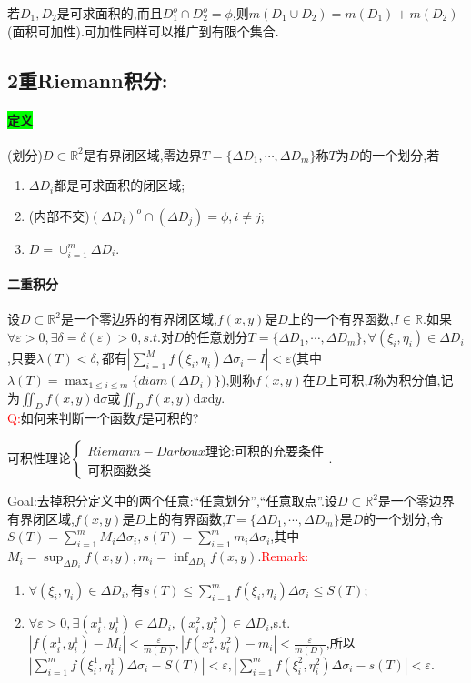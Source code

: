 \documentclass[UTF8]{ctexart}
\renewcommand{\d}{\mathrm{d}}
\begin{document}
        若$D_1,D_2$是可求面积的,而且$D_1^o\cap D_2^o=\phi$,则$m(D_1\cup D_2)=m(D_1)+m(D_2)$(面积可加性).可加性同样可以推广到有限个集合.

    \subsection{2重Riemann积分:}
    \paragraph{\colorbox{lime}{定义}}(划分)$D\subset\mathbb{R}^2$是有界闭区域,零边界$T=\{\Delta D_1,\cdots,\Delta D_m\}$称$T$为$D$的一个划分,若
    \begin{enumerate}[1)]
        \item $\Delta D_i$都是可求面积的闭区域;
        \item (内部不交)$(\Delta D_i)^o\cap(\Delta D_j)=\phi,i\not=j$;
        \item $D=\cup_{i=1}^m\Delta D_i$.
    \end{enumerate}
    \paragraph{二重积分}设$D\subset\mathbb{R}^2$是一个零边界的有界闭区域,$f(x,y)$是$D$上的一个有界函数,$I\in \mathbb{R}$.如果$\forall\varepsilon>0,\exists\delta=\delta(\varepsilon)>0,s.t.$对$D$的任意划分$T=\{\Delta D_1,\cdots,\Delta D_m\},\forall(\xi_i,\eta_i)\in\Delta D_i$,只要$\lambda(T)<\delta,$都有$|\sum_{i=1}^Mf(\xi_i,\eta_i)\Delta\sigma_i-I|<\varepsilon$(其中$\lambda(T)=\max_{1\le i\le m}\{diam(\Delta D_i)\}$),则称$f(x,y)$在$D$上可积,$I$称为积分值,记为$\iint_Df(x,y)\d\sigma$或$\iint_Df(x,y)\d x\d y$.\\
    \textcolor{red}{Q:}如何来判断一个函数$f$是可积的?

    可积性理论$\begin{cases}
        Riemann-Darboux\text{理论:可积的充要条件}\\
        \text{可积函数类}
    \end{cases}$.

    Goal:去掉积分定义中的两个任意:``任意划分'',``任意取点''.设$D\subset\mathbb{R}^2$是一个零边界有界闭区域,$f(x,y)$是$D$上的有界函数,$T=\{\Delta D_1,\cdots,\Delta D_m\}$是$D$的一个划分,令$S(T)=\sum_{i=1}^mM_i\Delta\sigma_i,s(T)=\sum_{i=1}^mm_i\Delta\sigma_i$,其中$M_i=\sup_{\Delta D_i}f(x,y),m_i=\inf_{\Delta D_i}f(x,y)$.\textcolor{red}{Remark:}
    \begin{enumerate}
        \item $\forall(\xi_i,\eta_i)\in\Delta D_i,$有$s(T)\le\sum_{i=1}^mf(\xi_i,\eta_i)\Delta\sigma_i\le S(T)$;
        \item $\forall\varepsilon>0,\exists(x_i^1,y_i^1)\in\Delta D_i,(x_i^2,y_i^2)\in\Delta D_i$,s.t.$|f(x_i^1,y_i^1)-M_i|<\frac{\varepsilon}{m(D)},|f(x_i^2,y_i^2)-m_i|<\frac{\varepsilon}{m(D)}$,所以$|\sum_{i=1}^mf(\xi_i^1,\eta_i^1)\Delta\sigma_i-S(T)|<\varepsilon,|\sum_{i=1}^mf(\xi_i^2,\eta_i^2)\Delta\sigma_i-s(T)|<\varepsilon$.
    \end{enumerate}
\end{document}
